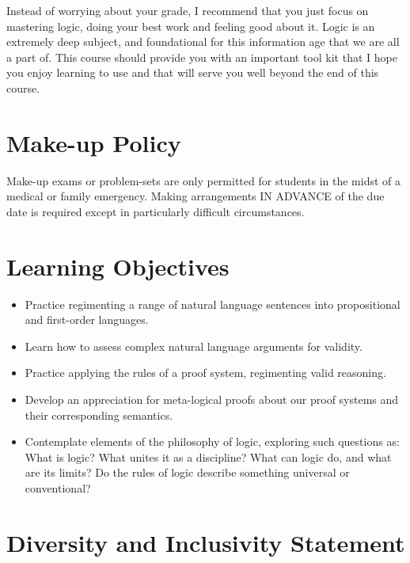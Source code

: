 \documentclass[letterpaper]{inzane_syllabus} %
\begin{document}
Instead of worrying about your grade, I recommend that you just focus on mastering logic, doing your best work and feeling good about it.
Logic is an extremely deep subject, and foundational for this information age that we are all a part of.
This course should provide you with an important tool kit that I hope you enjoy learning to use and that will serve you well beyond the end of this course.

\vspace{0.5cm}
\section{Make-up Policy}

Make-up exams or problem-sets are only permitted for students in the midst of a medical or family emergency.
Making arrangements IN ADVANCE of the due date is required except in particularly difficult circumstances.

\vspace{0.5cm}
\section{Learning Objectives}

\begin{itemize}
  \item Practice regimenting a range of natural language sentences into propositional and first-order languages.
  \item Learn how to assess complex natural language arguments for validity.
  \item Practice applying the rules of a proof system, regimenting valid reasoning.
  \item Develop an appreciation for meta-logical proofs about our proof systems and their corresponding semantics.
  \item Contemplate elements of the philosophy of logic, exploring such questions as: What is logic? What unites it as a discipline? What can logic do, and what are its limits? Do the rules of logic describe something universal or conventional?
\end{itemize}

\vspace{0.5cm}
\section{Diversity and Inclusivity Statement}
\end{document}
